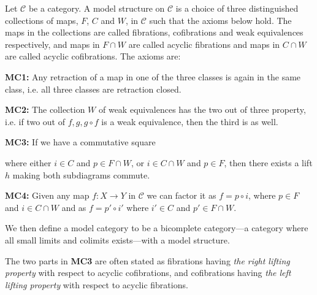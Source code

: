 \begin{definition}
Let $\mathcal{C}$ be a category. A model structure on $\mathcal{C}$ is a choice of three distinguished collections of maps, $F$, $C$ and $W$, in $\mathcal{C}$
such that the axioms below hold. The maps in the collections are called fibrations, cofibrations and weak equivalences respectively, and maps in $F\cap W$ are called acyclic fibrations and maps in $C\cap W$ are called acyclic cofibrations. The axioms are:

\textbf{MC1:}
Any retraction of a map in one of the three classes is again in the same class, i.e. all three classes are retraction closed. 

\textbf{MC2:}
The collection $W$ of weak equivalences has the two out of three property, i.e. if two out of $f, g, g\circ f$ is a weak equivalence, then the third is as well.

\textbf{MC3:}
If we have a commutative square 

\begin{center}
\end{center}

where either $i\in C$ and $p\in F\cap W$, or $i\in C\cap W$ and $p\in F$, then there exists a lift $h$ making both subdiagrams commute.

\textbf{MC4:}
Given any map $f:X\longrightarrow Y$ in $\mathcal{C}$ we can factor it as $f=p\circ i$, where $p\in F$ and $i\in C\cap W$ and as $f=p'\circ i'$ where $i'\in C$ and $p'\in F\cap W$. 
\end{definition}

We then define a model category to be a bicomplete category---a category where all small limits and colimits exists---with a model structure. 

The two parts in \textbf{MC3} are often stated as fibrations having \emph{the right lifting property} with respect to acyclic cofibrations, and cofibrations having \emph{the left lifting property} with respect to acyclic fibrations. 


